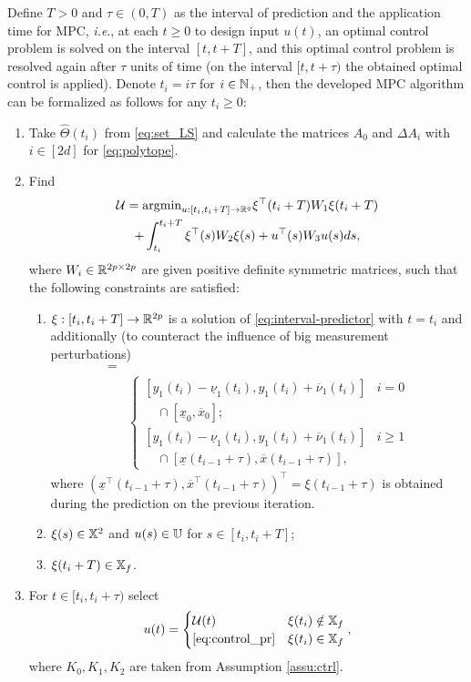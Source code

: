 \documentclass[letterpaper, 10 pt, conference]{ieeeconf}  %
\begin{document}
Define $T>0$ and $\tau\in(0,T)$ as the interval of prediction and
the application time for MPC, \emph{i.e}., at each $t\geq0$ to design
input $u(t)$, an optimal control problem is solved on the interval
$[t,t+T]$, and this optimal control problem is resolved again
after $\tau$ units of time (on the interval $[t,t+\tau)$ the obtained
optimal control is applied). Denote $t_{i}=i\tau$ for $i\in\mathbb{N}_{+}$,
then the developed MPC algorithm can be formalized as follows for
any $t_{i}\geq0$:
\begin{enumerate}
\item Take $\hat{\Theta}(t_{i})$ from \eqref{eq:set_LS} and calculate
the matrices $A_{0}$ and $\Delta A_{i}$ with $i\in[2d]$ for \eqref{eq:polytope}.
\item Find
\begin{gather}
\mathcal{U}=\text{argmin}_{u:[t_{i},t_{i}+T]\to\mathbb{R}^{q}}\xi^{\top}(t_{i}+T)W_{1}\xi(t_{i}+T)\label{eq:OCP}\\
+\int_{t_{i}}^{t_{i}+T}\xi^{\top}(s)W_{2}\xi(s)+u^{\top}(s)W_{3}u(s)ds,\nonumber 
\end{gather}
where $W_{i}\in\mathbb{R}^{2p\times2p}$ are given positive definite symmetric
matrices, such that the following constraints are satisfied: 
\begin{enumerate}
\item $\xi:[t_{i},t_{i}+T]\to\mathbb{R}^{2p}$ is a solution of \eqref{eq:interval-predictor}
with $t=t_{i}$ and additionally (to counteract the influence of big
measurement perturbations)
\begin{align}
[\underline{x}&(t_{i}),\overline{x}(t_{i})]=\label{eq:update}\\
&\begin{cases}
[y_{1}(t_{i})-\underline{\nu}_{1}(t_{i}),y_{1}(t_{i})+\overline{\nu}_{1}(t_{i})] & i=0\\
\quad\cap[\underline{x}_{0},\overline{x}_{0}];\\{}
[y_{1}(t_{i})-\underline{\nu}_{1}(t_{i}),y_{1}(t_{i})+\overline{\nu}_{1}(t_{i})] & i\geq1\\
\quad\cap[\underline{x}(t_{i-1}+\tau),\overline{x}(t_{i-1}+\tau)],
\end{cases}\nonumber
\end{align}
where $(\underline{x}^{\top}(t_{i-1}+\tau),\overline{x}^{\top}(t_{i-1}+\tau))^{\top}=\xi(t_{i-1}+\tau)$
is obtained during the prediction on the previous iteration.
\item $\xi(s)\in\mathbb{X}^{2}$ and $u(s)\in\mathbb{U}$ for $s\in[t_{i},t_{i}+T]$; 
\item $\xi(t_{i}+T)\in\mathbb{X}_{f}$.
\end{enumerate}
\item For $t\in[t_{i},t_{i}+\tau)$ select
\begin{equation}
u(t)=\begin{cases}
\mathcal{U}(t) & \xi(t_{i})\notin\mathbb{X}_{f}\\
\eqref{eq:control_pr} & \xi(t_{i})\in\mathbb{X}_{f}
\end{cases},\label{eq:control}
\end{equation}
where $K_{0},K_{1},K_{2}$ are taken from Assumption \ref{assu:ctrl}.
\end{enumerate}
\end{document}
